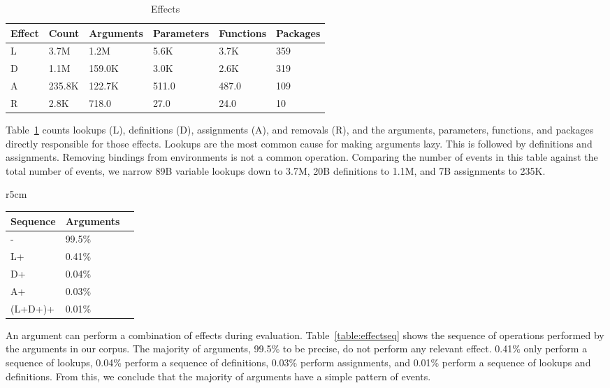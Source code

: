 \documentclass[review,nonacm,screen,acmsmall,anonymous=true]{acmart}
\begin{document}
\begin{table}[!h]  \vspace{-3mm}  \small
  \caption{Effects} \label{table:effects} \centering
  \begin{tabular}{llllll}    \toprule
    \textbf{Effect}&\textbf{Count}&\textbf{Arguments}&\textbf{Parameters}&\textbf{Functions}&\textbf{Packages}\\    \midrule
    L&3.7M&1.2M&5.6K&3.7K&359\\
    D&1.1M&159.0K&3.0K&2.6K&319\\
    A&235.8K&122.7K&511.0&487.0&109\\
    R&2.8K&718.0&27.0&24.0&10\\    \bottomrule
  \end{tabular}
\end{table}

\noindent
Table~\ref{table:effects} counts lookups (L), definitions (D), assignments (A),
and removals (R), and the arguments, parameters, functions, and packages directly
responsible for those effects. Lookups are the most common cause for making
arguments lazy. This is followed by definitions and assignments. Removing
bindings from environments is not a common operation.
%
Comparing the number of events in this table against the total number of events,
we narrow 89B variable lookups down to 3.7M, 20B definitions to 1.1M, and 7B
assignments to 235K.

\begin{wraptable}{r}{5cm}
  \vspace{-3mm}
  \small
  \caption{Effect Sequence} \label{table:effectseq}
  \centering
  \begin{tabular}{lll}
    \toprule
    \textbf{Sequence}&\textbf{Arguments}\\
    \midrule
    -&99.5\%\\
    L+&0.41\%\\
    D+&0.04\%\\
    A+&0.03\%\\
    (L+D+)+&0.01\%\\
    \bottomrule
  \end{tabular}
\end{wraptable}

An argument can perform a combination of effects during evaluation.
Table~\ref{table:effectseq} shows the sequence of operations performed by the
arguments in our corpus. The majority of arguments, 99.5\% to be precise, do not
perform any relevant effect. 0.41\% only perform a sequence of lookups, 0.04\%
perform a sequence of definitions, 0.03\% perform assignments, and 0.01\%
perform a sequence of lookups and definitions. From this, we conclude that
the majority of arguments have a simple pattern of events.
\end{document}
